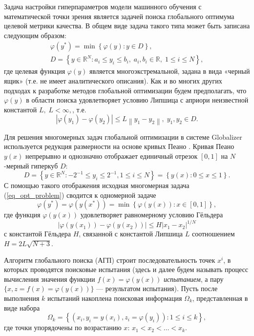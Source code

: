 \documentclass[11pt, oneside, a4paper]{article}
\begin{document}
Задача настройки гиперпараметров модели машинного обучения с математической точки зрения является задачей поиска глобального оптимума целевой метрики качества. 
В общем виде задача такого типа может быть записана следующим образом:
\begin{gather}
\varphi(y^\ast)=\min{\left\{\varphi(y):y\in D\right\}}, \label{eq_opt_problem}\\
D=\left\{y\in \mathbb{R}^N: a_i\leq y_i \leq b_i, \; a_i,b_i\in \mathbb{R}, \;  1\leq i \leq N\right\} \label{eq_D},
\end{gather}
где целевая функция $\varphi(y)$ является многоэкстремальной, задана в вида «черный ящик» (т.е. не имеет аналитического описания). Как и во многих других подходах к разработке методов глобальной оптимизации \cite{Evtushenko2013,Zilinskas2010,Pinter1996,Jones2009} будем предполагать, что $\varphi(y)$ в области поиска удовлетворяет условию Липшица с априори неизвестной константой $L, \; L<\infty,$, т.е. 
\[
\left|\varphi(y_1)-\varphi(y_2)\right|\leq L\left\|y_1-y_2\right\|,\; y_1,y_2 \in D.
\]

Для решения многомерных задач глобальной оптимизации в системе Globalizer используется редукция размерности на основе кривых Пеано \cite{Sergeyev2013, Strongin2000}. Кривая Пеано $y(x)$ непрерывно и однозначно отображает единичный отрезок $[0,1]$ на $N$-мерный гиперкуб $D$:
\[
D = \left\{ y \in \mathbb{R}^N: -2^{-1} \leq y_i \leq 2^{-1}, 1 \leq i \leq N \right\} = \left\{ y(x): 0 \leq x \leq 1 \right\}.
\]
С помощью такого отображения исходная многомерная задача (\ref{eq_opt_problem}) сводится к одномерной задаче
\[
\varphi(y^\ast)=\varphi(y(x^\ast))=\min{\left\{\varphi(y(x)): x\in[0,1]\right\}},
\]
где функция $\varphi(y(x))$ удовлетворяет равномерному условию Гёльдера
\[
\left|\varphi(y(x_1))-\varphi(y(x_2))\right|\leq H\left|x_1-x_2\right|^{1/N}
\]
с константой Гёльдера $H$, связанной с константой Липшица $L$ соотношением $H = 2L\sqrt{N+3}$.

Алгоритм глобального поиска (АГП) строит последовательность точек $x^i$, в которых проводятся поисковые испытания (здесь и далее будем называть процесс вычисления значения функции $f(x)=\varphi(y(x))$ \textit{испытанием}, а пару $\{x, z = f(x) = \varphi(y(x))\}$ --- результатом испытания). Пусть после выполнения $k$ испытаний накоплена поисковая информация $\Omega_k$, представленная в виде набора
\[
\Omega_k = \left\{ (x_i, y_i = y(x_i), z_i = \varphi(y_i)) : 1 \leq i \leq k \right\},
\]
где точки упорядочены по возрастанию $x$: $x_1 < x_2 < \ldots < x_k$.
\end{document}
